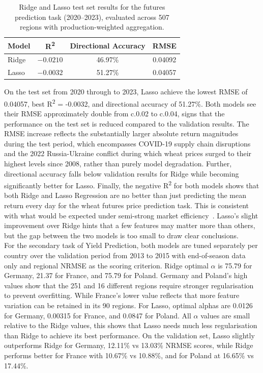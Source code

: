 \documentclass[pdflatex,sn-mathphys-num, oneside, 11pt]{sn-jnl}%
\theoremstyle{thmstyleone}%
\theoremstyle{thmstyletwo}%
\theoremstyle{thmstylethree}%
\begin{document}
\begin{table}[ht!]
\centering
\caption{Ridge and Lasso test set results for the futures prediction task (2020--2023), evaluated across 507 regions with production-weighted aggregation.}
\label{tab:linear_futures}
\begin{tabular}{lccc}
\toprule
\textbf{Model} & \textbf{R\textsuperscript{2}} & \textbf{Directional Accuracy} & \textbf{RMSE} \\
\midrule
Ridge & $-0.0210$ & 46.97\% & 0.04092 \\
Lasso & $-0.0032$ & 51.27\% & 0.04057 \\
\bottomrule
\end{tabular}
\end{table}
On the test set from 2020 through to 2023, Lasso achieve the lowest RMSE of 0.04057, best R\textsuperscript{2} = -0.0032, and directional accuracy of 51.27\%. Both models see their RMSE approximately double from c.0.02 to c.0.04, signs that the performance on the test set is reduced compared to the validation results. The RMSE increase reflects the substantially larger absolute return magnitudes during the test period, which encompasses COVID-19 supply chain disruptions and the 2022 Russia-Ukraine conflict during which wheat prices surged to their highest levels since 2008, rather than purely model degradation. Further, directional accuracy falls below validation results for Ridge while becoming significantly better for Lasso. Finally, the negative R\textsuperscript{2} for both models shows that both Ridge and Lasso Regression are no better than just predicting the mean return every day for the wheat futures price prediction task. This is consistent with what would be expected under semi-strong market efficiency~\cite{bib30}. Lasso's slight improvement over Ridge hints that a few features may matter more than others, but the gap between the two models is too small to draw clear conclusions.\\

For the secondary task of Yield Prediction, both models are tuned separately per country over the validation period from 2013 to 2015 with end-of-season data only and regional NRMSE as the scoring criterion. Ridge optimal $\alpha$ is 75.79 for Germany, 21.37 for France, and 75.79 for Poland. Germany and Poland's high values show that the 251 and 16 different regions require stronger regularisation to prevent overfitting. While France's lower value reflects that more feature variation can be retained in its 90 regions. For Lasso, optimal alphas are 0.0126 for Germany, 0.00315 for France, and 0.0847 for Poland. All $\alpha$ values are small relative to the Ridge values, this shows that Lasso needs much less regularisation than Ridge to achieve its best performance. On the validation set, Lasso slightly outperforms Ridge for Germany, 12.11\% vs 13.03\% NRMSE scores, while Ridge performs better for France with 10.67\% vs 10.88\%, and for Poland at 16.65\% vs 17.44\%.\\
\end{document}
